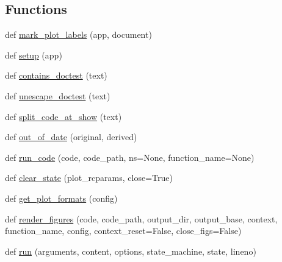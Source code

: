 \subsection*{Functions}
\begin{DoxyCompactItemize}
\item 
def \hyperlink{namespacematplotlib_1_1sphinxext_1_1plot__directive_ab35f723c51a5d0475ff3b77e893e803f}{mark\+\_\+plot\+\_\+labels} (app, document)
\item 
def \hyperlink{namespacematplotlib_1_1sphinxext_1_1plot__directive_a2121eefd343822cf8517411aaab004a6}{setup} (app)
\item 
def \hyperlink{namespacematplotlib_1_1sphinxext_1_1plot__directive_a0a70b327f0fd8ab814d9c823b0df89e3}{contains\+\_\+doctest} (text)
\item 
def \hyperlink{namespacematplotlib_1_1sphinxext_1_1plot__directive_ab53cf5e619d206768c1cb35401a33909}{unescape\+\_\+doctest} (text)
\item 
def \hyperlink{namespacematplotlib_1_1sphinxext_1_1plot__directive_aa8f4d80b0629f6cdafa20c6007708f35}{split\+\_\+code\+\_\+at\+\_\+show} (text)
\item 
def \hyperlink{namespacematplotlib_1_1sphinxext_1_1plot__directive_a870ed026933a3213ab3db642bd92b3a5}{out\+\_\+of\+\_\+date} (original, derived)
\item 
def \hyperlink{namespacematplotlib_1_1sphinxext_1_1plot__directive_a65985d5db4ce353396cba45f21113a7c}{run\+\_\+code} (code, code\+\_\+path, ns=None, function\+\_\+name=None)
\item 
def \hyperlink{namespacematplotlib_1_1sphinxext_1_1plot__directive_acb32ad5cc5808aa47f003754f035b381}{clear\+\_\+state} (plot\+\_\+rcparams, close=True)
\item 
def \hyperlink{namespacematplotlib_1_1sphinxext_1_1plot__directive_aabbd8b372af5a778c3447348a745afd1}{get\+\_\+plot\+\_\+formats} (config)
\item 
def \hyperlink{namespacematplotlib_1_1sphinxext_1_1plot__directive_a349e94d00174448022b43700575b10c8}{render\+\_\+figures} (code, code\+\_\+path, output\+\_\+dir, output\+\_\+base, context, function\+\_\+name, config, context\+\_\+reset=False, close\+\_\+figs=False)
\item 
def \hyperlink{namespacematplotlib_1_1sphinxext_1_1plot__directive_a41db11b9d15fcf83873b030653ed826f}{run} (arguments, content, options, state\+\_\+machine, state, lineno)
\end{DoxyCompactItemize}
